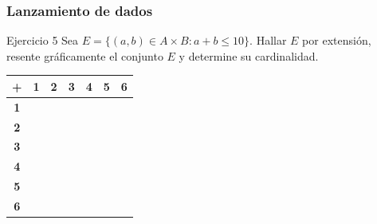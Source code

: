 \documentclass[aspectratio=169]{beamer}
\begin{document}
\begin{frame}[t]
	\frametitle{Lanzamiento de dados}
	\begin{block}{Ejercicio 5}
		Sea $E=\{(a, b)\in A\times B: a+b\leq 10\}$. Hallar $E$ por extensión, resente gráficamente el conjunto $E$ y determine su cardinalidad.
	\end{block}


	\renewcommand{\arraystretch}{1.3} %
	\begin{flushleft}
		\begin{tabular}{|c|*{6}{c|}}
			\hline
			\cellcolor{gray!30} \textbf{+}
			                                & \cellcolor{yellow} \textbf{1}
			                                & \cellcolor{yellow} \textbf{2}
			                                & \cellcolor{yellow} \textbf{3}
			                                & \cellcolor{yellow} \textbf{4}
			                                & \cellcolor{yellow} \textbf{5}
			                                & \cellcolor{yellow} \textbf{6}               \\
			\hline
			\cellcolor{green!70} \textbf{1} &                               &  &  &  &  & \\ \hline
			\cellcolor{green!70} \textbf{2} &                               &  &  &  &  & \\ \hline
			\cellcolor{green!70} \textbf{3} &                               &  &  &  &  & \\ \hline
			\cellcolor{green!70} \textbf{4} &                               &  &  &  &  & \\ \hline
			\cellcolor{green!70} \textbf{5} &                               &  &  &  &  & \\ \hline
			\cellcolor{green!70} \textbf{6} &                               &  &  &  &  & \\
			\hline
		\end{tabular}
	\end{flushleft}
\end{frame}
\end{document}
